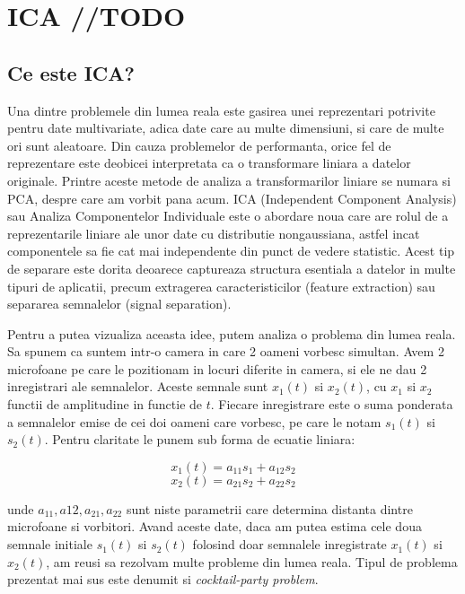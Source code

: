\documentclass[12pt]{article}
\begin{document}
\section{ICA //TODO}

\subsection{Ce este ICA?}
Una dintre problemele din lumea reala este gasirea unei reprezentari potrivite pentru date multivariate, adica date care au multe dimensiuni, si care de multe ori sunt aleatoare. Din cauza problemelor de performanta, orice fel de reprezentare este deobicei interpretata ca o transformare liniara a datelor originale. Printre aceste metode de analiza a transformarilor liniare se numara si PCA, despre care am vorbit pana acum. ICA (Independent Component Analysis) sau Analiza Componentelor Individuale este o abordare noua care are rolul de a reprezentarile liniare ale unor date cu distributie nongaussiana, astfel incat componentele sa fie cat mai independente din punct de vedere statistic. Acest tip de separare este dorita deoarece captureaza structura esentiala a datelor in multe tipuri de aplicatii, precum extragerea caracteristicilor (feature extraction) sau separarea semnalelor (signal separation). 

Pentru a putea vizualiza aceasta idee, putem analiza o problema din lumea reala. Sa spunem ca suntem intr-o camera in care 2 oameni vorbesc simultan. Avem 2 microfoane pe care le pozitionam in locuri diferite in camera, si ele ne dau 2 inregistrari ale semnalelor. Aceste semnale sunt $x_1 (t)$ si $x_2 (t)$, cu $x_1$ si $x_2$ functii de amplitudine in functie de $t$. Fiecare inregistrare este o suma ponderata a semnalelor emise de cei doi oameni care vorbesc, pe care le notam $s_1(t)$ si $s_2(t)$. Pentru claritate le punem sub forma de ecuatie liniara:

\begin{equation}
	x_1(t)=a_{11} s_1 + a_{12} s_2
\end{equation}
\begin{equation}
	x_2(t)=a_{21} s_2 + a_{22} s_2
\end{equation}

unde $a_{11}, a{12}, a_{21}, a_{22}$ sunt niste parametrii care determina distanta dintre microfoane si vorbitori. Avand aceste date, daca am putea estima cele doua semnale initiale $s_1(t)$ si $s_2(t)$ folosind doar semnalele inregistrate $x_1(t)$ si $x_2(t)$, am reusi sa rezolvam multe probleme din lumea reala. Tipul de problema prezentat mai sus este denumit si \textit{cocktail-party problem}.
\newpage
\end{document}
